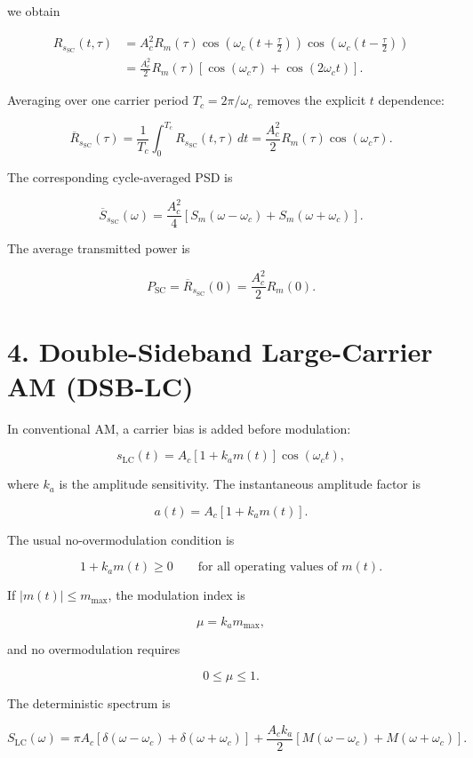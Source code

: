 \documentclass[11pt]{article}
\begin{document}
we obtain

\[
\begin{aligned}
R_{s_{\mathrm{SC}}}(t,\tau)
&=A_c^2 R_m(\tau)
\cos\left(\omega_c\left(t+\frac{\tau}{2}\right)\right)
\cos\left(\omega_c\left(t-\frac{\tau}{2}\right)\right) \\
&=\frac{A_c^2}{2}R_m(\tau)
\left[\cos(\omega_c\tau)+\cos(2\omega_c t)\right].
\end{aligned}
\]

Averaging over one carrier period $T_c=2\pi/\omega_c$ removes the explicit $t$ dependence:

\[
\overline{R}_{s_{\mathrm{SC}}}(\tau)
=\frac{1}{T_c}\int_0^{T_c}R_{s_{\mathrm{SC}}}(t,\tau)\,dt
=\frac{A_c^2}{2}R_m(\tau)\cos(\omega_c\tau).
\]

The corresponding cycle-averaged PSD is

\[
\overline{S}_{s_{\mathrm{SC}}}(\omega)
=\frac{A_c^2}{4}\left[S_m(\omega-\omega_c)+S_m(\omega+\omega_c)\right].
\]

The average transmitted power is

\[
P_{\mathrm{SC}}=\overline{R}_{s_{\mathrm{SC}}}(0)=\frac{A_c^2}{2}R_m(0).
\]

\section{4. Double-Sideband Large-Carrier AM (DSB-LC)}

In conventional AM, a carrier bias is added before modulation:

\[
s_{\mathrm{LC}}(t)=A_c\left[1+k_a m(t)\right]\cos(\omega_c t),
\]

where $k_a$ is the amplitude sensitivity. The instantaneous amplitude factor is

\[
a(t)=A_c\left[1+k_a m(t)\right].
\]

The usual no-overmodulation condition is

\[
1+k_a m(t)\geq 0 \qquad \text{for all operating values of } m(t).
\]

If $|m(t)|\leq m_{\max}$, the modulation index is

\[
\mu=k_a m_{\max},
\]

and no overmodulation requires

\[
0\leq \mu \leq 1.
\]

The deterministic spectrum is

\[
S_{\mathrm{LC}}(\omega)
=\pi A_c\left[\delta(\omega-\omega_c)+\delta(\omega+\omega_c)\right]
+\frac{A_c k_a}{2}\left[M(\omega-\omega_c)+M(\omega+\omega_c)\right].
\]
\end{document}
